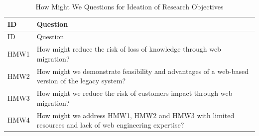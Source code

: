 \hypertarget{tbl:hmw}{}
\begin{longtable}[]{@{}ll@{}}
\caption{\label{tbl:hmw}How Might We Questions for Ideation of Research Objectives}\tabularnewline
\toprule
\begin{minipage}[b]{0.06\columnwidth}\raggedright
ID\strut
\end{minipage} & \begin{minipage}[b]{0.88\columnwidth}\raggedright
Question\strut
\end{minipage}\tabularnewline
\midrule
\endfirsthead
\toprule
\begin{minipage}[b]{0.06\columnwidth}\raggedright
ID\strut
\end{minipage} & \begin{minipage}[b]{0.88\columnwidth}\raggedright
Question\strut
\end{minipage}\tabularnewline
\midrule
\endhead
\begin{minipage}[t]{0.06\columnwidth}\raggedright
HMW1\strut
\end{minipage} & \begin{minipage}[t]{0.88\columnwidth}\raggedright
How might reduce the risk of loss of knowledge through web migration?\strut
\end{minipage}\tabularnewline
\begin{minipage}[t]{0.06\columnwidth}\raggedright
HMW2\strut
\end{minipage} & \begin{minipage}[t]{0.88\columnwidth}\raggedright
How might we demonstrate feasibility and advantages of a web-based version of the legacy system?\strut
\end{minipage}\tabularnewline
\begin{minipage}[t]{0.06\columnwidth}\raggedright
HMW3\strut
\end{minipage} & \begin{minipage}[t]{0.88\columnwidth}\raggedright
How might we reduce the risk of customers impact through web migration?\strut
\end{minipage}\tabularnewline
\begin{minipage}[t]{0.06\columnwidth}\raggedright
HMW4\strut
\end{minipage} & \begin{minipage}[t]{0.88\columnwidth}\raggedright
How might we address HMW1, HMW2 and HMW3 with limited resources and lack of web engineering expertise?\strut
\end{minipage}\tabularnewline
\bottomrule
\end{longtable}

